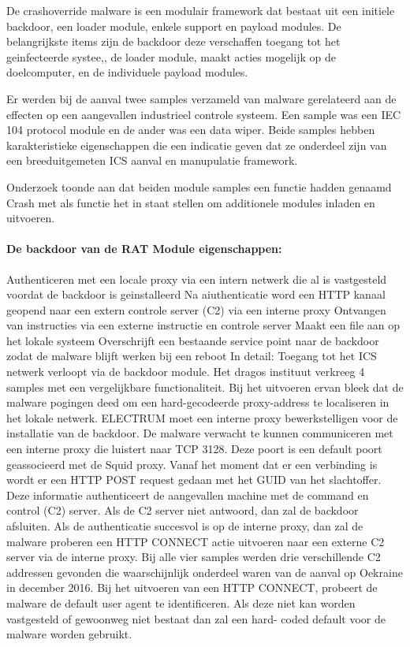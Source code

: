 		De crashoverride malware is een modulair framework dat bestaat uit een initiele backdoor, een
		loader module, enkele support en payload modules.
		De belangrijkste items zijn de backdoor deze verschaffen toegang tot het geinfecteerde systee,, de
		loader module, maakt acties mogelijk op de doelcomputer, en de individuele payload modules.
		
		Er werden bij de aanval twee samples verzameld van malware gerelateerd aan de effecten op een
		aangevallen industrieel controle systeem. Een sample was een IEC 104 protocol module en de ander
		was een data wiper. Beide samples hebben karakteristieke eigenschappen die een indicatie geven
		dat ze onderdeel zijn van een breeduitgemeten ICS aanval en manupulatie framework.
		
		Onderzoek toonde aan dat beiden module samples een functie hadden genaamd Crash met als
		functie het in staat stellen om additionele modules inladen en uitvoeren.
		
		
		\paragraph{De backdoor van de RAT Module eigenschappen:}
		
		Authenticeren met een locale proxy via een intern netwerk die al is vastgesteld voordat de
		backdoor is geinstalleerd
		Na aiuthenticatie word een HTTP kanaal geopend naar een extern controle server (C2) via
		een interne proxy
		Ontvangen van instructies via een externe instructie en controle server
		Maakt een file aan op het lokale systeem
		Overschrijft een bestaande service point naar de backdoor zodat de malware blijft werken
		bij een reboot
		In detail:
		Toegang tot het ICS netwerk verloopt via de backdoor module. Het dragos instituut verkreeg 4
		samples met een vergelijkbare functionaliteit. Bij het uitvoeren ervan bleek dat de malware pogingen
		deed om een hard-gecodeerde proxy-address te localiseren in het lokale netwerk. ELECTRUM moet
		een interne proxy bewerkstelligen voor de installatie van de backdoor.
		De malware verwacht te kunnen communiceren met een interne proxy die luistert naar TCP 3128.
		Deze poort is een default poort geassocieerd met de Squid proxy. Vanaf het moment dat er een
		verbinding is wordt er een HTTP POST request gedaan met het GUID van het slachtoffer. Deze
		informatie authenticeert de aangevallen machine met de command en control (C2) server. Als de C2
		server niet antwoord, dan zal de backdoor afsluiten.
		Als de authenticatie succesvol is op de interne proxy, dan zal de malware proberen een HTTP
		CONNECT actie uitvoeren naar een externe C2 server via de interne proxy.
		Bij alle vier samples werden drie verschillende C2 addressen gevonden die waarschijnlijk onderdeel
		waren van de aanval op Oekraine in december 2016.
		Bij het uitvoeren van een HTTP CONNECT, probeert de malware de default user agent te
		identificeren. Als deze niet kan worden vastgesteld of gewoonweg niet bestaat dan zal een hard-
		coded default voor de malware worden gebruikt.
		
